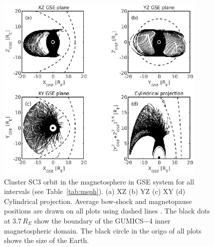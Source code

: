 \documentclass[draft]{agujournal2019}
\begin{document}
\begin{figure}[h]
\centering
\includegraphics[width=0.9\textwidth,angle=0]{swe-2021sw002807-f11} 
\caption{Cluster SC3 orbit in the magnetosphere in GSE system for all intervals (see Table~\ref{tab:msph}). (a) XZ (b) YZ (c) XY (d) Cylindrical projection. Average bow-shock and magnetopause positions are drawn on all plots using dashed lines \cite[respectively]{peredo95:_three_alfven_mach,tsyganenko95:_model_earth}. The black dots at $3.7\,R_E$ show the boundary of the GUMICS$-$4 inner magnetospheric domain. The black circle in the origo of all plots shows the size of the Earth.}
\label{fig:msphorbit}
\end{figure}

\pagebreak
\end{document}
